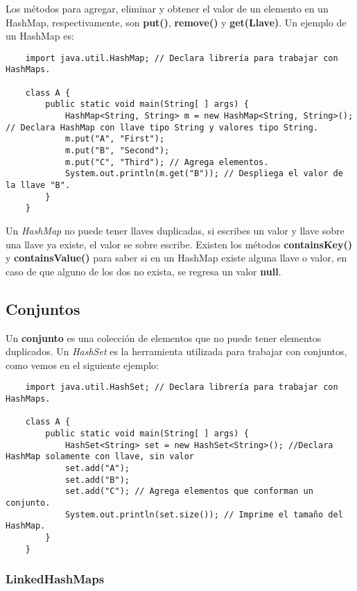 Los métodos para agregar, eliminar y obtener el valor de un elemento en un HashMap, respectivamente, son \textbf{put()}, \textbf{remove()} y \textbf{get(Llave)}. Un ejemplo de un HashMap es:
\begin{lstlisting}
    import java.util.HashMap; // Declara librería para trabajar con HashMaps.
    
    class A {
        public static void main(String[ ] args) {
            HashMap<String, String> m = new HashMap<String, String>(); // Declara HashMap con llave tipo String y valores tipo String.
            m.put("A", "First");
            m.put("B", "Second");
            m.put("C", "Third"); // Agrega elementos.
            System.out.println(m.get("B")); // Despliega el valor de la llave "B".
        }
    }
\end{lstlisting}

Un \textit{HashMap} no puede tener llaves duplicadas, si escribes un valor y llave sobre una llave ya existe, el valor se sobre escribe. Existen los métodos \textbf{containsKey()} y \textbf{containsValue()} para saber si en un HashMap existe alguna llave o valor, en caso de que alguno de los dos no exista, se regresa un valor \textbf{null}.


\subsection{Conjuntos}

Un \textbf{conjunto} es una colección de elementos que no puede tener elementos duplicados. Un \textit{HashSet} es la herramienta utilizada para trabajar con conjuntos, como vemos en el siguiente ejemplo:
\begin{lstlisting}
    import java.util.HashSet; // Declara librería para trabajar con HashMaps.
    
    class A {
        public static void main(String[ ] args) {
            HashSet<String> set = new HashSet<String>(); //Declara HashMap solamente con llave, sin valor
            set.add("A");
            set.add("B");	
            set.add("C"); // Agrega elementos que conforman un conjunto.
            System.out.println(set.size()); // Imprime el tamaño del HashMap.
        }
    }
\end{lstlisting}


\subsubsection{LinkedHashMaps}

